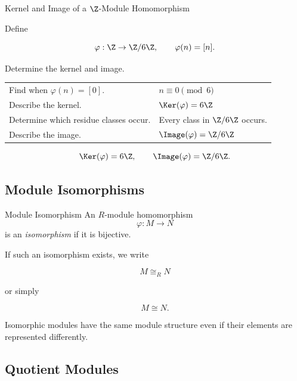 \begin{workedexamplebox}{Kernel and Image of a \(\Z\)-Module Homomorphism}

Define

\[ \varphi:\Z\to\Z/6\Z,\qquad\varphi(n)=[n]. \]

Determine the kernel and image.

\begin{tabularx}{\textwidth}{@{}>{\raggedright\arraybackslash}p{}X@{}}
Find when \(\varphi(n)=[0]\). & \(n\equiv0\pmod6\)\\
Describe the kernel. & \(\Ker(\varphi)=6\Z\)\\
Determine which residue classes occur. & Every class in \(\Z/6\Z\) occurs.\\
Describe the image. & \(\Image(\varphi)=\Z/6\Z\)
\end{tabularx}

\begin{answerbox}
\[ \Ker(\varphi)=6\Z,\qquad\Image(\varphi)=\Z/6\Z. \]
\end{answerbox}
\end{workedexamplebox}

\subsection{Module Isomorphisms}
\label{subsec:module-isomorphisms}

\begin{definitionbox}{Module Isomorphism}
An \(R\)-module homomorphism
\[ \varphi:M\to N \]
is an \emph{isomorphism} if it is bijective.
\end{definitionbox}

If such an isomorphism exists, we write

\[ M\cong_R N \]

or simply

\[ M\cong N. \]

Isomorphic modules have the same module structure even if their elements are
represented differently.

\subsection{Quotient Modules}
\label{subsec:quotient-modules}


